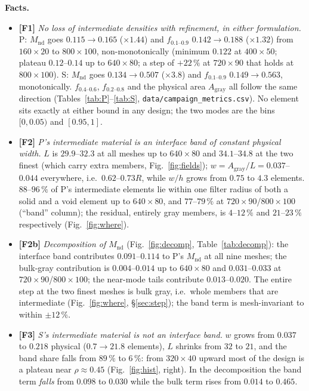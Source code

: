 \documentclass[10pt,a4paper]{article}
\newcommand{\Mnd}{M_{\mathrm{nd}}}
\newcommand{\fgray}{f_{0.1\text{--}0.9}}
\newcommand{\code}[1]{\texttt{\small #1}}
\newcommand{\fact}[1]{\textbf{[F#1]}}
\begin{document}
\noindent\textbf{Facts.}\nopagebreak
\begin{itemize}
\item \fact{1} \emph{No loss of intermediate densities with refinement, in either formulation.} P: $\Mnd$ goes $0.115\to0.165$ ($\times1.44$) and $\fgray$ $0.142\to0.188$ ($\times1.32$) from $160\times20$ to $800\times100$, non-monotonically (minimum $0.122$ at $400\times50$; plateau $0.12$--$0.14$ up to $640\times80$; a step of $+22\,\%$ at $720\times90$ that holds at $800\times100$). S: $\Mnd$ goes $0.134\to0.507$ ($\times3.8$) and $\fgray$ $0.149\to0.563$, monotonically. $f_{0.4\text{--}0.6}$, $f_{0.2\text{--}0.8}$ and the physical area $A_{\mathrm{gray}}$ all follow the same direction (Tables~\ref{tab:P}--\ref{tab:S}, \code{data/campaign\_metrics.csv}). No element sits exactly at either bound in any design; the two modes are the bins $[0,0.05)$ and $[0.95,1]$.
\item \fact{2} \emph{P's intermediate material is an interface band of constant physical width.} $L$ is $29.9$--$32.3$ at all meshes up to $640\times80$ and $34.1$--$34.8$ at the two finest (which carry extra members, Fig.~\ref{fig:fields}); $w=A_{\mathrm{gray}}/L=0.037$--$0.044$ everywhere, i.e.\ $0.62$--$0.73R$, while $w/h$ grows from $0.75$ to $4.3$ elements. $88$--$96\,\%$ of P's intermediate elements lie within one filter radius of both a solid and a void element up to $640\times80$, and $77$--$79\,\%$ at $720\times90$/$800\times100$ (``band'' column); the residual, entirely gray members, is $4$--$12\,\%$ and $21$--$23\,\%$ respectively (Fig.~\ref{fig:where}).
\item \fact{2b} \emph{Decomposition of $\Mnd$} (Fig.~\ref{fig:decomp}, Table~\ref{tab:decomp}): the interface band contributes $0.091$--$0.114$ to P's $\Mnd$ at all nine meshes; the bulk-gray contribution is $0.004$--$0.014$ up to $640\times80$ and $0.031$--$0.033$ at $720\times90$/$800\times100$; the near-mode tails contribute $0.013$--$0.020$. The entire step at the two finest meshes is bulk gray, i.e.\ whole members that are intermediate (Fig.~\ref{fig:where}, \S\ref{sec:step}); the band term is mesh-invariant to within $\pm12\,\%$.
\item \fact{3} \emph{S's intermediate material is not an interface band.} $w$ grows from $0.037$ to $0.218$ physical ($0.7\to21.8$ elements), $L$ shrinks from $32$ to $21$, and the band share falls from $89\,\%$ to $6\,\%$: from $320\times40$ upward most of the design is a plateau near $\rho\approx0.45$ (Fig.~\ref{fig:hist}, right). In the decomposition the band term \emph{falls} from $0.098$ to $0.030$ while the bulk term rises from $0.014$ to $0.465$.

\end{itemize}
\end{document}
